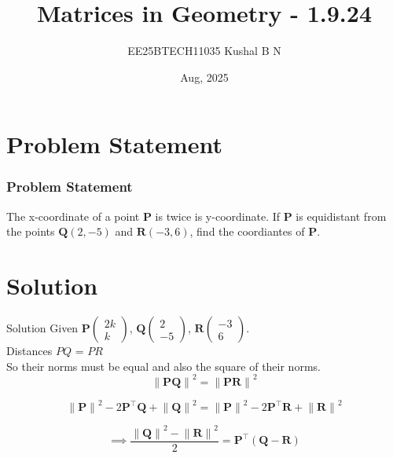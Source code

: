 \documentclass{beamer}
\title{Matrices in Geometry - 1.9.24}
\author{EE25BTECH11035  Kushal B N}
\date{Aug, 2025}
\let\vec\mathbf
\providecommand{\brak}[1]{\ensuremath{\left(#1\right)}}
\theoremstyle{remark}
\providecommand{\norm}[1]{\lVert#1\rVert}
\newcommand{\myvec}[1]{\ensuremath{\begin{pmatrix}#1\end{pmatrix}}}
\begin{document}
\maketitle


\begin{frame}
\tableofcontents
\end{frame}

\section{Problem Statement}
\begin{frame}
\frametitle{Problem Statement}
The x-coordinate of a point $\vec{P}$ is twice is y-coordinate. If $\vec{P}$ is equidistant from the points $\vec{Q}$$\brak{2,-5}$ and $\vec{R}$$\brak{-3,6}$, find the coordiantes of $\vec{P}$.
\end{frame}

\section{Solution}
\begin{frame}{Solution}
   Given $\vec{P}$$\myvec{2k\\k}$, $\vec{Q}\myvec{2\\-5}$, $\vec{R}\myvec{-3\\6}$.\\
   Distances $PQ$ = $PR$ \\
   So their norms must be equal and also the square of their norms.
   \begin{equation}
{\norm{\vec{PQ}}}^{2} = {\norm{\vec{PR}}}^2
   \end{equation}

\begin{equation}
    {\norm{\vec{P}}}^2 - 2\vec{P}^{\top}\vec{Q} + {\norm{\vec{Q}}}^2 = {\norm{\vec{P}}}^2 - 2\vec{P}^{\top}\vec{R} + {\norm{\vec{R}}}^2
\end{equation}

\begin{equation}
    \implies \frac{{\norm{\vec{Q}}}^2 - {\norm{\vec{R}}}^2}{2} = \vec{P}^{\top}\brak{\vec{Q}-\vec{R}}
\end{equation}
    
\end{frame}
\end{document}
